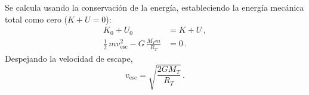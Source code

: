 
Se calcula usando la conservación de la energía, estableciendo la energía
mecánica total como cero ($K + U = 0$):
\begin{align*}
  K_0 + U_0 &= K + U \,, \\
  \frac{1}{2}\,m v_{\text{esc}}^{2} - G\,\frac{M_T m}{R_T} &= 0 \,.
\end{align*}
Despejando la velocidad de escape,
\begin{equation}
  \boxed{v_{\text{esc}} = \sqrt{\frac{2 G M_T}{R_T}}} \,.
\end{equation}
